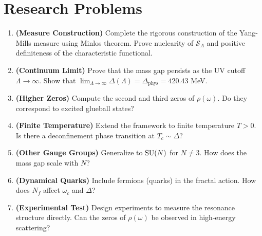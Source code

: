 \section*{Research Problems}

\begin{enumerate}
\item \textbf{(Measure Construction)} Complete the rigorous construction of the Yang-Mills measure using Minlos theorem. Prove nuclearity of $\mathcal{S}_A$ and positive definiteness of the characteristic functional.

\item \textbf{(Continuum Limit)} Prove that the mass gap persists as the UV cutoff $\Lambda \to \infty$. Show that $\lim_{\Lambda \to \infty} \Delta(\Lambda) = \Delta_{\text{phys}} = 420.43$ MeV.

\item \textbf{(Higher Zeros)} Compute the second and third zeros of $\rho(\omega)$. Do they correspond to excited glueball states?

\item \textbf{(Finite Temperature)} Extend the framework to finite temperature $T > 0$. Is there a deconfinement phase transition at $T_c \sim \Delta$?

\item \textbf{(Other Gauge Groups)} Generalize to $\operatorname{SU}(N)$ for $N \neq 3$. How does the mass gap scale with $N$?

\item \textbf{(Dynamical Quarks)} Include fermions (quarks) in the fractal action. How does $N_f$ affect $\omega_c$ and $\Delta$?

\item \textbf{(Experimental Test)} Design experiments to measure the resonance structure directly. Can the zeros of $\rho(\omega)$ be observed in high-energy scattering?
\end{enumerate}
